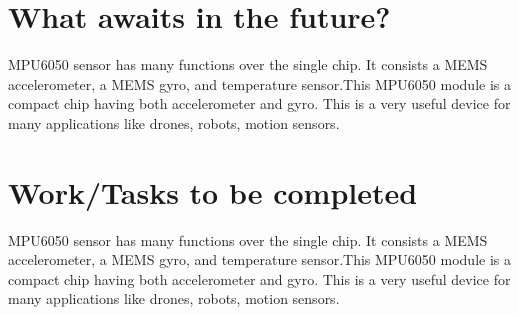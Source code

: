 \documentclass[12pt]{article}
\begin{document}




\pagebreak
\section{What awaits in the future?}
MPU6050 sensor has many functions over the single chip. It consists a MEMS accelerometer, a MEMS gyro, and temperature sensor.This MPU6050 module is a compact chip having both accelerometer and gyro. This is a very useful device for many applications like drones, robots, motion sensors.




\section{Work/Tasks to be completed}
MPU6050 sensor has many functions over the single chip. It consists a MEMS accelerometer, a MEMS gyro, and temperature sensor.This MPU6050 module is a compact chip having both accelerometer and gyro. This is a very useful device for many applications like drones, robots, motion sensors.


\end{document}
